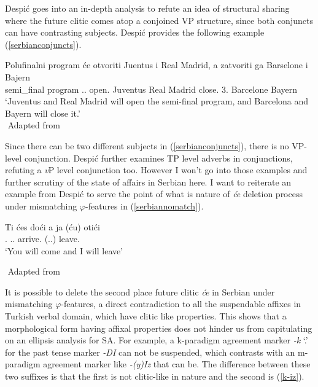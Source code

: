Despi\'{c} goes into an in-depth analysis to refute an idea of structural sharing where the future clitic comes atop a conjoined VP structure, since both conjuncts can have contrasting subjects. Despi\'c provides the following example (\ref{serbianconjuncts}).

\begin{exe}
    \ex \label{serbianconjuncts}
    \gll 
    Polufinalni program  \'{c}e otvoriti Juentus i {Real Madrid,} a zatvoriti ga Barselone i Bajern \\ semi\_final program {\Aux}.{\Third}{\Sg}.{\Fut} open.{\Inf} Juventus {\And} {Real Madrid} {\And} close.{\Inf} 3.{\Sg} Barcelone {\And} Bayern \\
    \glt `Juventus and Real Madrid will open the semi-final program, and Barcelona and Bayern will close it.' \\
    ${}$ \hfill Adapted from \cite{despic2017suspended}
\end{exe}

Since there can be two different subjects in (\ref{serbianconjuncts}), there is no VP-level conjunction. Despi\'c further examines TP level adverbs in conjunctions, refuting a \textit{v}P level conjunction too. However I won't go into those examples and further scrutiny of the state of affairs in Serbian here. I want to reiterate an example from Despi\'c to serve the point of what is nature of \textit{\'ce} deletion process under mismatching $\varphi$-features in (\ref{serbiannomatch}).

\begin{exe}
    \ex \label{serbiannomatch}
    \begin{xlist}
        \ex \gll 
        Ti \'{c}es do\'{c}i a ja (\'{c}u) oti\'{c}i \\ {\Second}.{\Sg} {\Aux}.{\Second}{\Sg}.{\Fut} arrive.{\Inf} {\And} {\First}{\Sg} ({\Aux}.{\First}{\Sg}.{\Fut}) leave.{\Inf} \\
        \glt `You will come and I will leave'
    \end{xlist}
    ${}$ \hfill Adapted from \cite{despic2017suspended}
\end{exe}

It is possible to delete the second place future clitic \textit{\'ce} in Serbian under mismatching $\varphi$-features, a direct contradiction to all the suspendable affixes in Turkish verbal domain, which have clitic like properties. This shows that a morphological form having affixal properties does not hinder us from capitulating on an ellipsis analysis for SA. For example, a k-paradigm agreement marker \textit{-k} `{\First}.{\Pl}' for the past tense marker \textit{-DI} can not be suspended, which contrasts with an m-paradigm agreement marker like \textit{-(y)Iz} that can be. The difference between these two suffixes is that the first is not clitic-like in nature and the second is (\ref{k-iz}).

